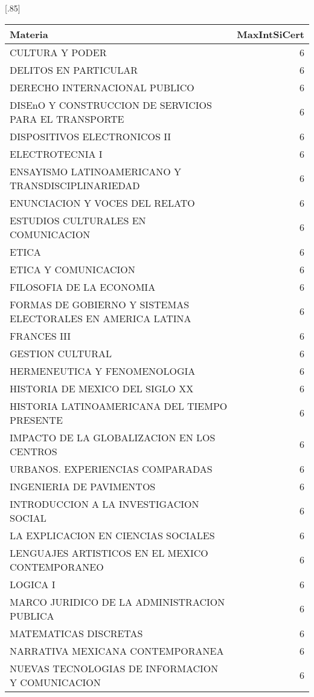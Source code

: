 \documentclass[12pt]{article}
\begin{document}
\begin{table}[ht]
\centering
\scalebox{0.75}[.85]{
\begin{tabular}{lr}
  \hline
 Materia & MaxIntSiCert \\ 
  \hline
    CULTURA Y PODER & 6 \\ 
  DELITOS EN PARTICULAR & 6 \\ 
  DERECHO INTERNACIONAL PUBLICO & 6 \\ 
  DISEnO Y CONSTRUCCION DE SERVICIOS PARA EL TRANSPORTE & 6 \\ 
  DISPOSITIVOS ELECTRONICOS II & 6 \\ 
  ELECTROTECNIA I & 6 \\ 
  ENSAYISMO LATINOAMERICANO Y TRANSDISCIPLINARIEDAD & 6 \\ 
  ENUNCIACION Y VOCES DEL RELATO & 6 \\ 
  ESTUDIOS CULTURALES EN COMUNICACION & 6 \\ 
  ETICA & 6 \\ 
  ETICA Y COMUNICACION & 6 \\ 
  FILOSOFIA DE LA ECONOMIA & 6 \\ 
  FORMAS DE GOBIERNO Y SISTEMAS ELECTORALES EN AMERICA LATINA & 6 \\ 
  FRANCES III & 6 \\ 
  GESTION CULTURAL & 6 \\ 
  HERMENEUTICA Y FENOMENOLOGIA & 6 \\ 
  HISTORIA DE MEXICO DEL SIGLO XX & 6 \\ 
  HISTORIA LATINOAMERICANA DEL TIEMPO PRESENTE & 6 \\ 
  IMPACTO DE LA GLOBALIZACION EN LOS CENTROS & 6 \\
  URBANOS. EXPERIENCIAS COMPARADAS & 6 \\ 
  INGENIERIA DE PAVIMENTOS & 6 \\ 
  INTRODUCCION A LA INVESTIGACION SOCIAL & 6 \\ 
  LA EXPLICACION EN CIENCIAS SOCIALES & 6 \\ 
  LENGUAJES ARTISTICOS EN EL MEXICO CONTEMPORANEO & 6 \\ 
  LOGICA I & 6 \\ 
  MARCO JURIDICO DE LA ADMINISTRACION PUBLICA & 6 \\ 
  MATEMATICAS DISCRETAS & 6 \\ 
  NARRATIVA MEXICANA CONTEMPORANEA & 6 \\ 
  NUEVAS TECNOLOGIAS DE INFORMACION Y COMUNICACION & 6 \\ 

\end{tabular}}
\end{table}
\end{document}
